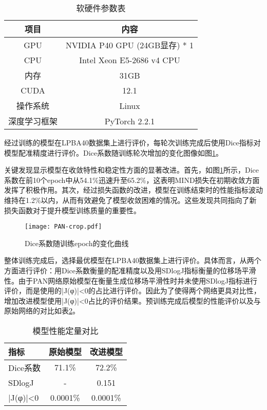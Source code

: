 \begin{table}[ht]
    \centering
    \caption{软硬件参数表}
    \begin{tabular}{c c}
        \toprule
        \textbf{项目} & \textbf{内容}                 \\
        \midrule
        GPU         & NVIDIA P40 GPU (24GB显存) * 1 \\
        CPU         & Intel Xeon E5-2686 v4 CPU   \\
        内存          & 31GB                        \\
        CUDA        & 12.1                        \\
        操作系统        & Linux                       \\
        深度学习框架      & PyTorch 2.2.1               \\
        \bottomrule
    \end{tabular}
    \label{tab:environment}
\end{table}

经过训练的模型在LPBA40数据集上进行评价，每轮次训练完成后使用Dice指标对模型配准精度进行评价。Dice系数随训练轮次增加的变化图像如图\ref{fig:PANDice}。

关键发现显示模型在收敛特性和稳定性方面的显著改进。首先，如图\ref{fig:PANDice}所示，Dice系数在前10个epoch中从54.1\%迅速升至65.2\%，这表明MIND损失在初期收敛方面发挥了积极作用。其次，经过损失函数的改进，模型在训练结束时的性能指标波动维持在1.2\%以内，从而有效避免了模型收敛困难的情况。这些发现共同指向了新损失函数对于提升模型训练质量的重要性。

\begin{figure}[h]
    \centering
    \texttt{[image: PAN-crop.pdf]}
    \caption{Dice系数随训练epoch的变化曲线}
    \label{fig:PANDice}
\end{figure}

整体训练完成后，选择最优模型在LPBA40数据集上进行评价。具体而言，从两个方面进行评价：用Dice系数衡量的配准精度以及用SDlogJ指标衡量的位移场平滑性。由于PAN网络原始模型在衡量生成位移场平滑性时并未使用SDlogJ指标进行评价，而是使用的|J(φ)|<0的占比进行评价。因此为了使得两个网络更具对比性，增加改进模型使用|J(φ)|<0占比的评价结果。预训练完成后模型的性能评价以及与原始网络的对比如表\ref{tab:PANresult}。

\begin{table}[h]
    \centering
    \caption{模型性能定量对比}
    \label{tab:PANresult}
    \begin{tabular}{lcc}
        \toprule
        \textbf{指标} & \textbf{原始模型} & \textbf{改进模型} \\
        \midrule
        Dice系数      & 71.1\%        & 72.2\%        \\
        SDlogJ      & -             & 0.151         \\
        |J(φ)|<0    & 0.0001\%      & 0.0001\%      \\
        \bottomrule
    \end{tabular}
\end{table}

